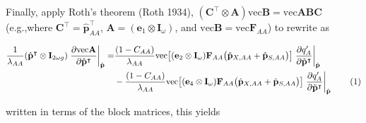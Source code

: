 \documentclass[11pt]{article}
\newcommand\numberthis{\addtocounter{equation}{1}\tag{\theequation}}
\def\mbf#1{\mathbf{#1}}
\begin{document}
\begin{landscape}
\noindent Finally, apply Roth's theorem (Roth 1934), $\left( \mbf{C}^{\intercal} \otimes \mbf{A} \right) \text{vec}\mbf{B} = \text{vec}\mbf{ABC}$ (e.g.,where $\mbf{C}^{\intercal} = \hat{\mbf{p}}^{\intercal}_{AA}$, $\mbf{A} = (\mbf{e}_1 \otimes \mbf{I}_{\omega})$, and $\text{vec}\mbf{B} = \text{vec}\mbf{F}_{AA}$) to rewrite as

\begin{align*}
	\frac{1}{\lambda_{AA}}(\hat{\mbf{p}}^{\intercal} \otimes \mbf{I}_{2 \omega g}) \left. \frac{ \partial \text{vec}\mbf{A}}{\partial \hat{\mbf{p}}^{\intercal}} \right|_{\hat{\mbf{p}}} = 
		&\frac{(1 - C_{AA})}{\lambda_{AA}}  \text{vec}\big[(\mbf{e}_{2} \otimes \mbf{I}_{\omega}) \mbf{F}_{AA} \big(\hat{\mbf{p}}_{X,AA}+ \hat{\mbf{p}}_{S,AA}  \big)\big]  \left.\frac{\partial q^{\prime}_{A}}{\partial \tilde{\mbf{p}}^{\intercal}} \right|_{\hat{\mbf{p}}}  \\
		&- \frac{(1 - C_{AA})}{\lambda_{AA}}  \text{vec}\big[(\mbf{e}_{4} \otimes \mbf{I}_{\omega}) \mbf{F}_{AA} \big(\hat{\mbf{p}}_{X,AA}+ \hat{\mbf{p}}_{S,AA}  \big)\big]  \left.\frac{\partial q^{\prime}_{A}}{\partial \tilde{\mbf{p}}^{\intercal}} \right|_{\hat{\mbf{p}}}  \label{eq:partCwithpartials_app} \numberthis
\end{align*}

\noindent written in terms of the block matrices, this yields


\end{landscape}
\end{document}
